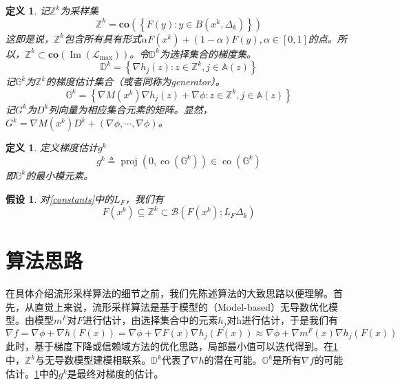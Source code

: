 \documentclass[macfonts]{njuthesis}
\newtheorem{defn}[thm]{定义}
\newtheorem{asp}[thm]{假设}
\begin{document}
\begin{defn}
\label{ZDG}
记$\mathbb{Z}^{k}$为采样集
$$
\mathbb{Z}^{k}=\mathbf{co}\left(\left\{F(y):y\in B(x^k,\Delta_k)\right\}\right)
$$
这即是说，$\mathbb{Z}^{k}$包含所有具有形式$\alpha F\left(x^{k}\right)+(1-\alpha) F(y), \alpha \in[0,1]$的点。所以，$\mathbb{Z}^k\subset\mathbf{c o}\left(\operatorname{Im}\left(\mathcal{L}_{\max }\right)\right)$。令$\mathbb{D}^{k}$为选择集合的梯度集。
$$
\mathbb{D}^{k}=\left\{\nabla h_{j}(z): z \in \mathbb{Z}^{k}, j \in \mathbb{A}(z)\right\}
$$
记$\mathbb{G}^{k}$为$\mathbb{Z}^{k}$的梯度估计集合（或者同\cite{manifold}称为generator）。
$$
\mathbb{G}^{k}=\left\{\nabla M\left(x^{k}\right) \nabla h_{j}(z)+\nabla \phi: z \in \mathbb{Z}^{k}, j \in \mathbb{A}(z)\right\}
$$
记$G^{k}$为$D^{k}$列向量为相应集合元素的矩阵。显然，$G^{k}=\nabla M\left(x^{k}\right) D^{k}+\left( \nabla\phi, \cdots, \nabla \phi \right)$。
\end{defn}


\begin{defn}
\label{g}
定义梯度估计$g^k$
\begin{equation}
\label{defg}
g^{k} \triangleq \operatorname{proj}\left(0, \operatorname{co}\left(\mathbb{G}^{k}\right)\right) \in \operatorname{co}\left(\mathbb{G}^{k}\right)
\end{equation}
即$\mathbb{G}^{k}$的最小模元素。
\end{defn}




\begin{asp}
对\ref{constants}中的$L_F$，我们有
$$
F\left(x^{k}\right) \subseteq \mathbb{Z}^{k} \subset \mathcal{B}\left(F\left(x^{k}\right) ; L_{F} \Delta_{k}\right)
$$
\end{asp}


\section{算法思路}

在具体介绍流形采样算法的细节之前，我们先陈述算法的大致思路以便理解。首先，从直觉上来说，流形采样算法是基于模型的（Model-based）无导数优化模型。由模型$m^F$对$F$进行估计，由选择集合中的元素$h_j$对h进行估计，于是我们有
$$
\nabla f=\nabla \phi +\nabla h(F(x))=\nabla \phi +\nabla F(x) \nabla h_{j}(F(x)) \approx \nabla \phi +\nabla m^F(x) \nabla h_{j}(F(x))
$$
此时，基于梯度下降或信赖域方法的优化思路，局部最小值可以迭代得到。在\ref{ZDG}中，$\mathbb{Z}^{k}$与无导数模型建模相联系。$\mathbb{D}^{k}$代表了$\nabla h$的潜在可能。$\mathbb{G}^{k}$是所有$\nabla f$的可能估计。\ref{g}中的$g^k$是最终对梯度的估计。
\end{document}

